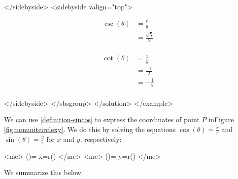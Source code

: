             </sidebyside>
            <sidebyside valign="top">
              
                \begin{align*}
                   \csc(\theta) &= \frac{r}{y} \\
                   &= \frac{\sqrt{5}}{2} \\
                \end{align*}
              
              
                \begin{align*}
                   \cot(\theta) &= \frac{x}{y} \\
                   &= \frac{-1}{2} \\
                   &= -\frac{1}{2} \\
                \end{align*}
              
            </sidebyside>
          </sbsgroup>
        </solution>
      </example>

      
        We can use \ref{definition-sincos} to express the coordinates of point $P$ inFigure \ref{fig:nonunitcirclexy}. We do this by solving the equations $ \cos (\theta ) = \frac{x}{r} $ and $ \sin (\theta ) = \frac{y}{r} $ for $x$ and $y$, respectively:
      
      
          <me> \cos(\theta)= \implies x=r\cos(\theta) </me>
          <me> \sin(\theta)= \implies y=r\sin(\theta) </me>

      
      
        We summarize this below.
      
